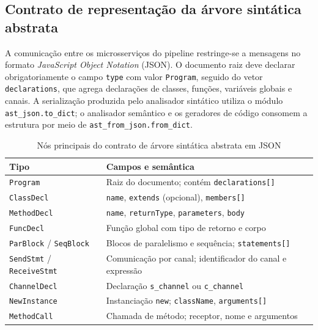 
\subsection{Contrato de representação da árvore sintática abstrata}

A comunicação entre os microsserviços do pipeline restringe-se a mensagens no formato \emph{JavaScript Object Notation} (JSON). O documento raiz deve declarar obrigatoriamente o campo \texttt{type} com valor \texttt{Program}, seguido do vetor \texttt{declarations}, que agrega declarações de classes, funções, variáveis globais e canais. A serialização produzida pelo analisador sintático utiliza o módulo \texttt{ast\_json.to\_dict}; o analisador semântico e os geradores de código consomem a estrutura por meio de \texttt{ast\_from\_json.from\_dict}.

\begin{table}[htbp]
\centering
\small
\caption{Nós principais do contrato de árvore sintática abstrata em JSON}
\label{tab:ast-contract-nodes}
\begin{tabularx}{\textwidth}{|>{\raggedright\arraybackslash}p{3.2cm}|X|}
\hline
\textbf{Tipo} & \textbf{Campos e semântica} \\
\hline
\texttt{Program} & Raiz do documento; contém \texttt{declarations[]} \\
\texttt{ClassDecl} & \texttt{name}, \texttt{extends} (opcional), \texttt{members[]} \\
\texttt{MethodDecl} & \texttt{name}, \texttt{returnType}, \texttt{parameters}, \texttt{body} \\
\texttt{FuncDecl} & Função global com tipo de retorno e corpo \\
\texttt{ParBlock} / \texttt{SeqBlock} & Blocos de paralelismo e sequência; \texttt{statements[]} \\
\texttt{SendStmt} / \texttt{ReceiveStmt} & Comunicação por canal; identificador do canal e expressão \\
\texttt{ChannelDecl} & Declaração \texttt{s\_channel} ou \texttt{c\_channel} \\
\texttt{NewInstance} & Instanciação \texttt{new}; \texttt{className}, \texttt{arguments[]} \\
\texttt{MethodCall} & Chamada de método; receptor, nome e argumentos \\
\hline
\end{tabularx}
\end{table}

